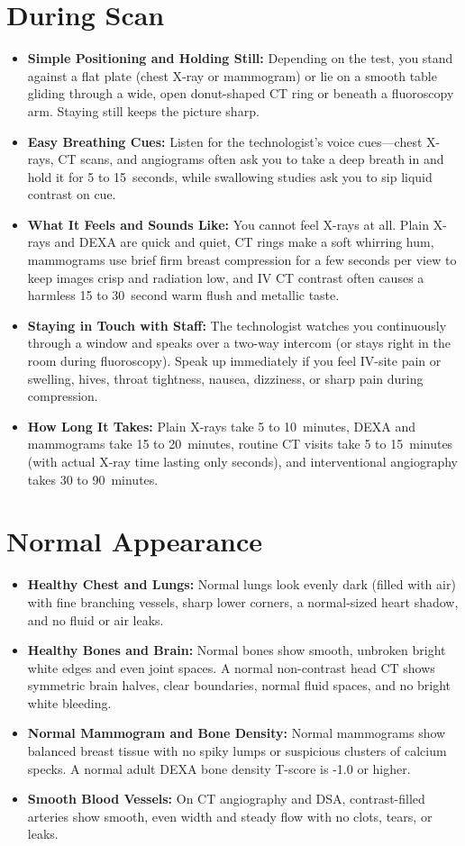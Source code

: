 \section{During Scan}
\begin{itemize}
  \item \textbf{Simple Positioning and Holding Still:} Depending on the test, you stand against a flat plate (chest X-ray or mammogram) or lie on a smooth table gliding through a wide, open donut-shaped CT ring or beneath a fluoroscopy arm. Staying still keeps the picture sharp.
  \item \textbf{Easy Breathing Cues:} Listen for the technologist's voice cues---chest X-rays, CT scans, and angiograms often ask you to take a deep breath in and hold it for 5 to 15~seconds, while swallowing studies ask you to sip liquid contrast on cue.
  \item \textbf{What It Feels and Sounds Like:} You cannot feel X-rays at all. Plain X-rays and DEXA are quick and quiet, CT rings make a soft whirring hum, mammograms use brief firm breast compression for a few seconds per view to keep images crisp and radiation low, and IV CT contrast often causes a harmless 15 to 30~second warm flush and metallic taste.
  \item \textbf{Staying in Touch with Staff:} The technologist watches you continuously through a window and speaks over a two-way intercom (or stays right in the room during fluoroscopy). Speak up immediately if you feel IV-site pain or swelling, hives, throat tightness, nausea, dizziness, or sharp pain during compression.
  \item \textbf{How Long It Takes:} Plain X-rays take 5 to 10~minutes, DEXA and mammograms take 15 to 20~minutes, routine CT visits take 5 to 15~minutes (with actual X-ray time lasting only seconds), and interventional angiography takes 30 to 90~minutes.
\end{itemize}

\section{Normal Appearance}
\begin{itemize}
  \item \textbf{Healthy Chest and Lungs:} Normal lungs look evenly dark (filled with air) with fine branching vessels, sharp lower corners, a normal-sized heart shadow, and no fluid or air leaks.
  \item \textbf{Healthy Bones and Brain:} Normal bones show smooth, unbroken bright white edges and even joint spaces. A normal non-contrast head CT shows symmetric brain halves, clear boundaries, normal fluid spaces, and no bright white bleeding.
  \item \textbf{Normal Mammogram and Bone Density:} Normal mammograms show balanced breast tissue with no spiky lumps or suspicious clusters of calcium specks. A normal adult DEXA bone density T-score is -1.0 or higher.
  \item \textbf{Smooth Blood Vessels:} On CT angiography and DSA, contrast-filled arteries show smooth, even width and steady flow with no clots, tears, or leaks.
\end{itemize}

